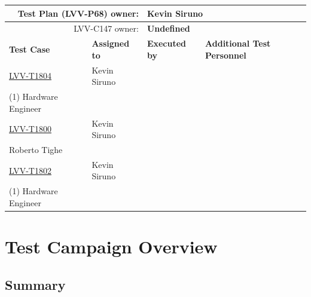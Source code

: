 \documentclass[SE,lsstdraft,STR,toc]{lsstdoc}
\begin{document}
{\small
\begin{longtable}{p{3cm}p{3cm}p{3cm}p{6cm}}
\hline
\multicolumn{2}{r}{Test Plan (LVV-P68) owner:} &
\multicolumn{2}{l}{\textbf{ Kevin Siruno } }\\\hline
\multicolumn{2}{r}{ LVV-C147 owner:} &
\multicolumn{2}{l}{\textbf{
    Undefined
}
} \\\hline
\textbf{Test Case} & \textbf{Assigned to} & \textbf{Executed by} & \textbf{Additional Test Personnel} \\ \hline
\href{https://jira.lsstcorp.org/secure/Tests.jspa#/testCase/LVV-T1804}{LVV-T1804}
& {\small Kevin Siruno } & {\small  } &
\begin{minipage}[]{6cm}
\smallskip
{\small (1) Software Engineer\\
(1) Hardware Engineer }
\medskip
\end{minipage}
\\ \hline
\href{https://jira.lsstcorp.org/secure/Tests.jspa#/testCase/LVV-T1800}{LVV-T1800}
& {\small Kevin Siruno } & {\small  } &
\begin{minipage}[]{6cm}
\smallskip
{\small Eric Coughlin\\
Roberto Tighe }
\medskip
\end{minipage}
\\ \hline
\href{https://jira.lsstcorp.org/secure/Tests.jspa#/testCase/LVV-T1802}{LVV-T1802}
& {\small Kevin Siruno } & {\small  } &
\begin{minipage}[]{6cm}
\smallskip
{\small (1) Software Engineer\\
(1) Hardware Engineer }
\medskip
\end{minipage}
\\ \hline
\end{longtable}
}

\newpage

\section{Test Campaign Overview}
\label{sect:overview}

\subsection{Summary}
\label{sect:summarytable}
\end{document}
